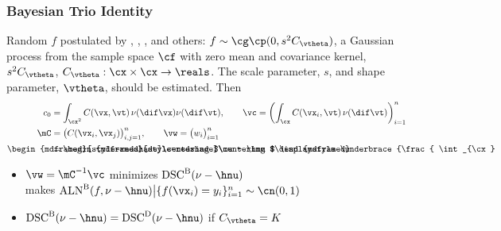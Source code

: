 \documentclass[10pt,compress,xcolor={usenames,dvipsnames}]{beamer} %
\DeclareMathOperator{\algn}{ALN}
\DeclareMathOperator{\disc}{DSC}
\DeclareMathOperator{\Var}{VAR}
\DeclareMathOperator{\GP}{\cg\cp}
\newcommand{\Dt}{\text{D}}
\newcommand{\Ba}{\text{B}}
\newcommand{\redroundmathbox}[1]{\parbox{\widthof{$#1$\hspace{1em}}}
	{\begin{mdframed}[style=redshade]\centering $#1$ \end{mdframed}}}
\begin{document}
\begin{frame}
	\frametitle{Bayesian Trio Identity}
	\vspace*{-4ex}
	\alert{Random} $f$ postulated by , , ,  and others:  $f \sim \GP (0, s^2C_{\vtheta})$,  a \alert{Gaussian process} from the sample space $\cf$ with zero mean and covariance kernel, $s^2C_{\vtheta}$, $C_{\vtheta}:\cx \times \cx \to \reals$. The \alert{scale parameter}, $s$, and \alert{shape parameter}, $\vtheta$, should be estimated.  	 Then 
	\vspace{-1ex}
	\begin{align*}
	c_0 & = \int_{\cx^2} C(\vx,\vt) \, \nu(\dif \vx) \nu(\dif \vt), \qquad \vc = \biggl( \int_{\cx} C(\vx_i,\vt) \,\nu(\dif \vt) \biggr)_{i=1}^n \\
	\mC & = \bigl( C(\vx_i,\vx_j) \bigr)_{i,j=1}^n, \qquad \vw = \bigl(w_i \bigr)_{i=1}^n\\
	\redroundmathbox{\mu - \hmu} 
	& = \redroundmathbox{\displaystyle%
		\underbrace{\frac{ \int_{\cx} f(\vx) \, (\nu - \hnu)(\dif\vx)}{s \sqrt{c_0 - 2 \vc^T \vw + \vw^T \mC \vw}}}_{\textstyle \algn^\Ba(f,\nu - \hnu)} \, 
		\underbrace{\sqrt{c_0 - 2 \vc^T \vw + \vw^T \mC \vw}}_{\textstyle\disc^\Ba(\nu - \hnu)} \, \underbrace{s}_{\textstyle\Var^\Ba(f)}}
	\end{align*}
	\vspace{-3ex}
	\begin{itemize}
		\item 	$\vw =  \mC^{-1}\vc$ minimizes  $\disc^\Ba(\nu - \hnu)$ \\
		\hspace{1.5cm} makes $\algn^\Ba(f,\nu - \hnu) \big \vert \{f(\vx_i )= y_i\}_{i=1}^n \sim \cn (0,1)$ 
	\item $\disc^\Ba(\nu - \hnu) =  \disc^\Dt(\nu - \hnu)$  if  $C_{\vtheta} = K$		
	\end{itemize}
		
\end{frame}
\end{document}
